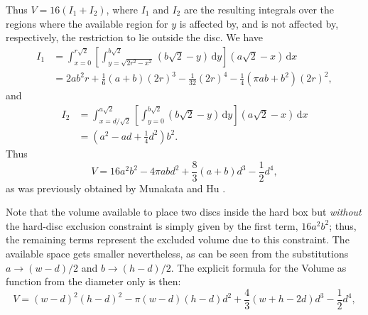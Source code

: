 \documentclass[a4paper,10pt, jcp, aps, preprint]{revtex4-1}
\newcommand{\rd}{\, \mathrm{d}}
\begin{document}
Thus $V = 16(I_1 + I_2)$, where $I_1$ and $I_2$ are the resulting integrals over the regions where the available region for $y$ is affected by, and is not affected by, respectively, the restriction to lie outside the disc.
We have
\begin{align}
 I_1 &= \int_{x=0}^{r\sqrt{2}} \left[ \int_{y = \sqrt{ 2r^2 - x^2}}^{b \sqrt{2}} \left( b \sqrt{2} - y \right) \rd y \right]  \left( a \sqrt{2} - x \right) \rd x \\
&= 	
2 a b^{2} r  + \textstyle \frac{1}{6} (a+b) (2r)^{3} - \frac{1}{32}  (2r)^{4} - \frac{1}{4} {\left(\pi a b + b^{2}\right)} (2r)^2,
\end{align}
and
\begin{align}
 I_2 &= \int_{x=d / \sqrt{2}}^{a \sqrt{2}} \left[ \int_{y = 0}^{b \sqrt{2}} \left( b \sqrt{2} - y \right) \rd y \right]  \left( a \sqrt{2} - x \right) \rd x \\
&=	
{\left( a^{2} - a d + \textstyle \frac{1}{4}  d^{2}\right)} b^{2}.
\end{align}
Thus 
\begin{equation}\label{volumeabd}
 V %
= 16 a^{2} b^{2}  - 4 \pi a b d^{2} + \textstyle \frac{8}{3} (a+b) d^{3}  - \frac{1}{2} d^{4},
\end{equation}
as was previously obtained by Munakata and Hu \cite{Munakata02}.

Note that the volume available to place two discs inside 
the hard box but \emph{without} the 
 hard-disc exclusion constraint is simply 
given by the first term, $16 a^2 b^2$; 
thus, the remaining terms represent the excluded volume due to this constraint.
The available space gets smaller nevertheless, as can be seen from
the substitutions $a\rightarrow (w-d)/2$ and $b\rightarrow (h-d)/2$.
The explicit formula for the Volume as function from the diameter only is then:
\begin{equation}\label{volumewhd}
 V 
= (w-d)^{2} (h-d)^{2}  - 
 \pi (w-d)(h-d) d^{2} + 
\textstyle \frac{4}{3} (w+h-2d) d^{3}  
- \frac{1}{2} d^{4},
\end{equation}
 
\end{document}
